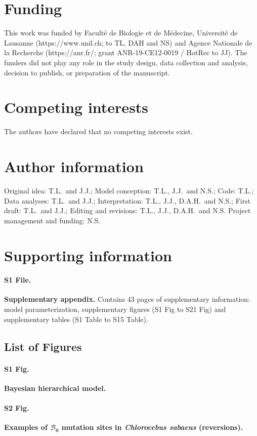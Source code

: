 \documentclass[10pt,letterpaper]{article}
\newcommand{\SphyBen}{\mathcal{B}_0}
\begin{document}
\section*{Funding}
This work was funded by Faculté de Biologie et de Médecine, Université de Lausanne (https://www.unil.ch; to TL, DAH and NS) and Agence Nationale de la Recherche (https://anr.fr/; grant ANR-19-CE12-0019 / HotRec to JJ). The funders did not play any role in the study design, data collection and analysis, decision to publish, or preparation of the manuscript.

\section*{Competing interests}
The authors have declared that no competing interests exist.

\section*{Author information}
Original idea: T.L.\ and J.J.;
Model conception: T.L., J.J.\ and N.S.;
Code: T.L.;
Data analyses: T.L.\ and J.J.;
Interpretation: T.L., J.J., D.A.H.\ and N.S.;
First draft: T.L.\ and J.J.;
Editing and revisions: T.L., J.J., D.A.H.\ and N.S.
Project management and funding: N.S\@.

\newpage
\section*{Supporting information}

\paragraph*{S1 File.}
\label{S1_File}
{\bf Supplementary appendix.} Contains 43 pages of supplementary information: model parameterization, supplementary figures (S1 Fig to S21 Fig) and supplementary tables (S1 Table to S15 Table).

\subsection*{List of Figures}
\paragraph*{S1 Fig.}
\label{S1_Fig}
{\bf Bayesian hierarchical model.}

\paragraph*{S2 Fig.}
\label{S2_Fig}
{\bf Examples of $\bm{\SphyBen}$ mutation sites in \textit{Chlorocebus sabaeus} (reversions).}
\end{document}
